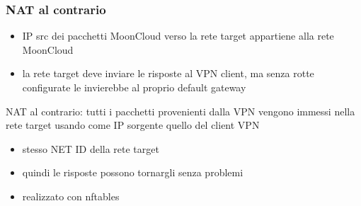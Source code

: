 

\begin{frame}
	\frametitle{NAT al contrario}
		
	\begin{itemize}
		\item IP src dei pacchetti MoonCloud verso la rete target
		      appartiene alla rete MoonCloud
		\item la rete target deve inviare le risposte al VPN client, ma senza
		      rotte configurate le invierebbe al proprio default gateway
	\end{itemize}
		
	\alert{NAT al contrario}: tutti i pacchetti provenienti dalla VPN vengono
	immessi nella rete target usando come IP sorgente quello del client VPN
	\begin{itemize}
		\item stesso NET ID della rete target
		\item quindi le risposte possono tornargli senza problemi
		\item realizzato con \alert{nftables}
	\end{itemize}
\end{frame}


